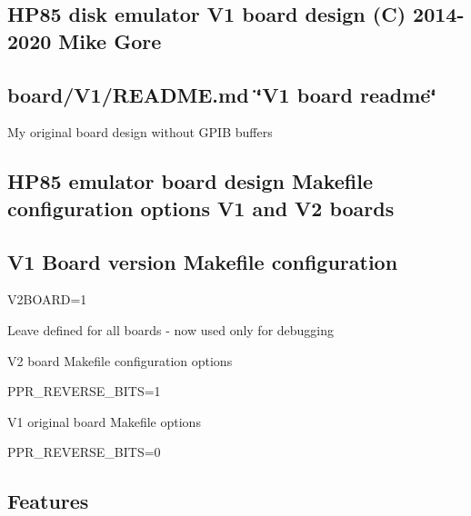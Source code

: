 \subsection*{H\+P85 disk emulator V1 board design (C) 2014-\/2020 Mike Gore}

\subsection*{board/\+V1/\+R\+E\+A\+D\+M\+E.\+md \char`\"{}\+V1 board readme\char`\"{}}


\begin{DoxyItemize}
\item My original board design without G\+P\+IB buffers
\end{DoxyItemize}

\subsection*{H\+P85 emulator board design Makefile configuration options V1 and V2 boards}

\subsection*{V1 Board version Makefile configuration}


\begin{DoxyItemize}
\item V2\+B\+O\+A\+RD=1
\begin{DoxyItemize}
\item Leave defined for all boards -\/ now used only for debugging
\end{DoxyItemize}
\end{DoxyItemize}

V2 board Makefile configuration options
\begin{DoxyItemize}
\item P\+P\+R\+\_\+\+R\+E\+V\+E\+R\+S\+E\+\_\+\+B\+I\+TS=1
\end{DoxyItemize}

V1 original board Makefile options
\begin{DoxyItemize}
\item P\+P\+R\+\_\+\+R\+E\+V\+E\+R\+S\+E\+\_\+\+B\+I\+TS=0
\end{DoxyItemize}





\subsection*{Features}


